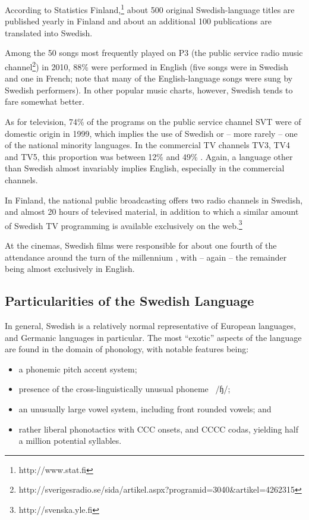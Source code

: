 \begin{multicols}{2}
According to Statistics Finland,\footnote{http://www.stat.fi} about
500 original Swedish-language titles are published yearly in Finland
and about an additional 100 publications are translated into Swedish.

Among the 50 songs most frequently played on P3 (the public service
radio music
channel\footnote{http://sverigesradio.se/sida/artikel.aspx?programid=3040\&artikel=4262315})
in 2010, 88\% were performed in English (five songs were in Swedish
and one in French; note that many of the English-language songs were
sung by Swedish performers). In other popular music charts, however,
Swedish tends to fare somewhat better.

As for television, 74\% of the programs on the public service channel
SVT were of domestic origin in 1999, which implies the use of Swedish
or -- more rarely -- one of the national minority languages. In the
commercial TV channels TV3, TV4 and TV5, this proportion was between
12\% and 49\% \cite[79]{falk2001}. Again, a language other than Swedish
almost invariably implies English, especially in the commercial
channels.

In Finland, the national public broadcasting offers two radio channels
in Swedish, and almost 20 hours of televised material, in addition to
which a similar amount of Swedish TV programming is available
exclusively on the web.\footnote{http://svenska.yle.fi}

At the cinemas, Swedish films were responsible for about one fourth of
the attendance around the turn of the millennium \cite[85]{falk2001},
with -- again -- the remainder being almost exclusively in English.


\subsection{Particularities of the Swedish Language}

In general, Swedish is a relatively normal representative of European
languages, and Germanic languages in particular. The most ``exotic''
aspects of the language are found in the domain of phonology, with
notable features being:

\begin{itemize}[itemsep=0pt,parsep=0pt]    
\item a phonemic pitch accent system;
\item presence of the cross-linguistically unusual
  phoneme~{ /ɧ/};
\item an unusually large vowel system, including front rounded vowels; and 
\item rather liberal phonotactics with CCC onsets, and CCCC codas, yielding half a million potential syllables.
\end{itemize}


\end{multicols}
